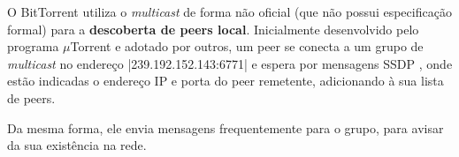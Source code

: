 O BitTorrent utiliza o \emph{multicast} de forma não oficial (que não possui
especificação formal) para a \textbf{descoberta de \glspl*{peer} local}. Inicialmente
desenvolvido pelo programa $\mu$Torrent e adotado por outros, um \gls*{peer} se
conecta a um grupo de \emph{multicast} no endereço \sverb|239.192.152.143:6771| e
espera por mensagens SSDP \cite{site:utorrent-forum}, onde estão indicadas o endereço
IP e porta do \gls*{peer} remetente, adicionando à sua lista de \glspl*{peer}.


\newpage
Da mesma forma, ele envia mensagens frequentemente para o grupo, para avisar da sua
existência na rede.

